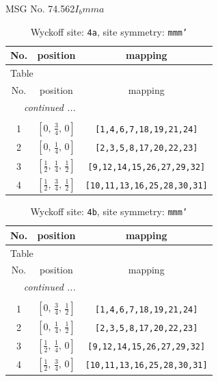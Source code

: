\documentclass[fleqn,8pt]{jsarticle}
\begin{document}
\setcounter{MaxMatrixCols}{32}

\renewcommand{\tablename}{Table~}
\renewcommand{\figurename}{Figure~}
\begin{center}
\LARGE
MSG No. 74.562\quad$I_{b}mma$
\end{center}
\renewcommand{\arraystretch}{1.2}
\begin{longtable}{ccc}
\caption{Wyckoff site: {\tt 4a}, site symmetry: {\tt mmm'}}
 \\
 \hline \hline
No. & position & mapping \\ \hline \endfirsthead

\multicolumn{2}{l}{\tablename\ \thetable{}} \\
 \hline \hline
No. & position & mapping \\ \hline \endhead

 \hline \hline
\multicolumn{2}{r}{\footnotesize\it continued ...} \\ \endfoot

 \hline \hline
\multicolumn{2}{r}{} \\ \endlastfoot

1 & $\left[ 0,\, \frac{3}{4},\, 0 \right]$ & {\tt [1,4,6,7,18,19,21,24]} \\ \hline
2 & $\left[ 0,\, \frac{1}{4},\, 0 \right]$ & {\tt [2,3,5,8,17,20,22,23]} \\ \hline
3 & $\left[ \frac{1}{2},\, \frac{1}{4},\, \frac{1}{2} \right]$ & {\tt [9,12,14,15,26,27,29,32]} \\ \hline
4 & $\left[ \frac{1}{2},\, \frac{3}{4},\, \frac{1}{2} \right]$ & {\tt [10,11,13,16,25,28,30,31]} \\
\end{longtable}
\renewcommand{\arraystretch}{1.2}
\begin{longtable}{ccc}
\caption{Wyckoff site: {\tt 4b}, site symmetry: {\tt mmm'}}
 \\
 \hline \hline
No. & position & mapping \\ \hline \endfirsthead

\multicolumn{2}{l}{\tablename\ \thetable{}} \\
 \hline \hline
No. & position & mapping \\ \hline \endhead

 \hline \hline
\multicolumn{2}{r}{\footnotesize\it continued ...} \\ \endfoot

 \hline \hline
\multicolumn{2}{r}{} \\ \endlastfoot

1 & $\left[ 0,\, \frac{3}{4},\, \frac{1}{2} \right]$ & {\tt [1,4,6,7,18,19,21,24]} \\ \hline
2 & $\left[ 0,\, \frac{1}{4},\, \frac{1}{2} \right]$ & {\tt [2,3,5,8,17,20,22,23]} \\ \hline
3 & $\left[ \frac{1}{2},\, \frac{1}{4},\, 0 \right]$ & {\tt [9,12,14,15,26,27,29,32]} \\ \hline
4 & $\left[ \frac{1}{2},\, \frac{3}{4},\, 0 \right]$ & {\tt [10,11,13,16,25,28,30,31]} \\
\end{longtable}
\end{document}
